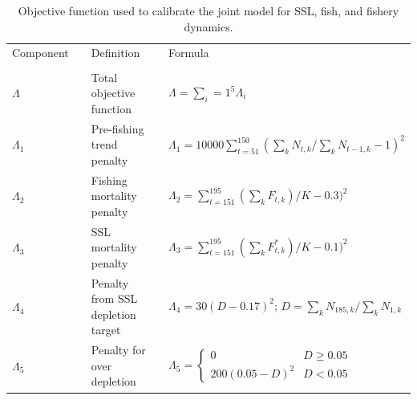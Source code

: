 \documentclass[nonumbib,leqno]{nrc1}
\begin{document}
\begin{table}
\caption{ \large Objective function used to calibrate the joint model for SSL, fish, and
fishery dynamics.}
\label{tab:inputs}
\begin{tabular}{lllll}
\\
\hline \hline
Component & & Definition & & Formula \\
\cline{1-1} \cline{3-3} \cline{5-5}
\\
$\Lambda$ & & Total objective function & & $\Lambda=\sum_i=1^5 \Lambda_i$ \\
$\Lambda_1$ & & Pre-fishing trend penalty & & $\Lambda_1=10000 \sum_{t=51}^{150} (\sum_k N_{t,k}/\sum_k N_{t-1,k} -1)^2$ \\
$\Lambda_2$ & & Fishing mortality penalty & & $\Lambda_2=\sum_{t=151}^{195} (\sum_k F_{t,k})/K - 0.3)^2$ \\
$\Lambda_3$ & & SSL mortality penalty & & $\Lambda_3=\sum_{t=151}^{195} (\sum_k F_{t,k}^*)/K - 0.1)^2$ \\
$\Lambda_4$ & & Penalty from SSL depletion target & & $ \Lambda_4=30 (D - 0.17)^2$;  $D=\sum_k N_{185,k}/\sum_k N_{1,k}$  \\
$\Lambda_5$ & & Penalty for over depletion & & $ \Lambda_5 = \left\{ \begin{array}{cc} 0 &  D \ge 0.05 \\ 200 (0.05-D)^2 &  D < 0.05 \end{array} \right. $\\
\bottomrule
\end{tabular}
\vspace{4in}
\end{table}
\end{document}
